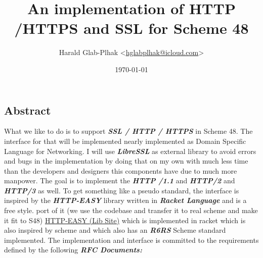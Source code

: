\documentclass[10pt,a4paper,english]{article}
\title{An implementation of HTTP /HTTPS and SSL for Scheme 48 }
\author{Harald Glab-Plhak {\textless}\href{mailto:hglabplhak@icloud.com}{hglabplhak@icloud.com}{\textgreater}}
\date{\today{}}
\newcommand{\abbrhighcol}[1]{\textbf{\textit{#1}}}
\begin{document}



\maketitle
\tableofcontents

\begin{multicols}{2}
\section{Abstract}

\begin{flushleft}
What we like to do is to support \abbrhighcol{SSL / HTTP  / HTTPS} in Scheme 48. The interface for that will be implemented nearly implemented as Domain Specific Language for Networking. I will use  \abbrhighcol{LibreSSL} as external library to avoid errors and bugs in the implementation by doing that on my own with much less time than the developers and designers this components have due to much more manpower.  
The goal is to implement the \abbrhighcol{HTTP /1.1} and \abbrhighcol{HTTP/2} and \abbrhighcol{HTTP/3} as well. To get something  like a pseudo standard,  the interface is inspired by the \abbrhighcol{HTTP-EASY} library written in  \abbrhighcol{Racket Language} and is a free style. port of it (we use the codebase and transfer it to real scheme and make it fit to S48)
\href{https://pkgs.racket-lang.org/package/http-easy-lib}{HTTP-EASY (Lib Site)}  which is implemented in racket which is also inspired by scheme and which also has an \abbrhighcol{R6RS} Scheme standard implemented. 
The implementation and interface is committed to the requirements defined by the following  \abbrhighcol{RFC Documents:}
\end{flushleft}


\end{multicols}
\end{document}
